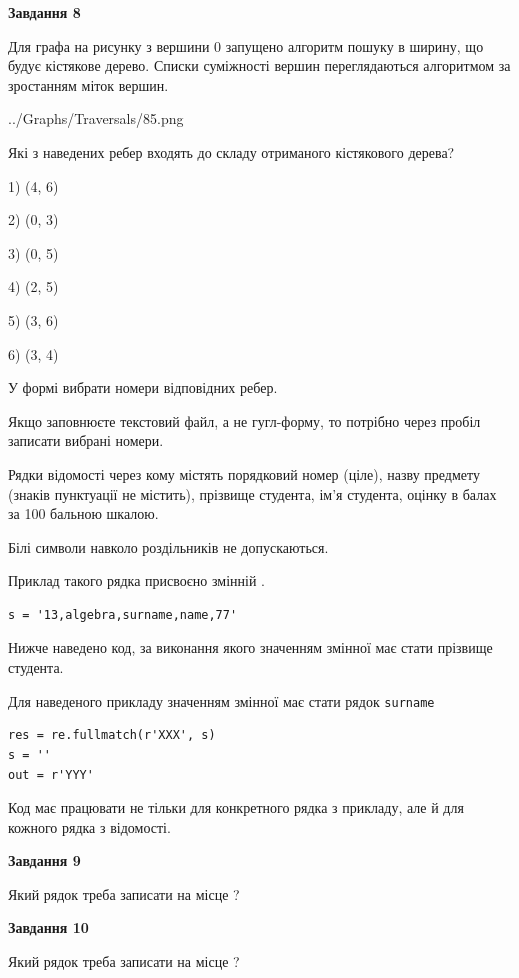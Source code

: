 \documentclass[12pt, ukrainian]{article}
\def\code#1{\Verb!#1!}
\begin{document}
{\begin {large}
{\begin {center}\textbf{Завдання 8}\end {center}}\par
Для графа на рисунку з вершини 0 запущено алгоритм пошуку в ширину, що будує кістякове дерево. Списки суміжності вершин переглядаються алгоритмом за зростанням міток вершин.\par
\begin{center}
	{../Graphs/Traversals/85.png}
\end{center}
\par Які з наведених ребер входять до складу отриманого кістякового дерева?\par
1) (4, 6)\par
2) (0, 3)\par
3) (0, 5)\par
4) (2, 5)\par
5) (3, 6)\par
6) (3, 4)\par
{\vskip 15pt} У формі вибрати номери відповідних ребер.


Якщо заповнюєте текстовий файл, а не гугл-форму, то потрібно через пробіл записа\-ти вибрані номери.\par
\newpage


Рядки відомості через кому містять порядковий номер (ціле), назву предмету (зна\-ків пунктуації не містить), прізвище студента, ім'я студента, оцінку в балах за 100 бальною шкалою.

Білі символи навколо роздільників не допускаються.

Приклад такого рядка присвоєно змінній .



\begin{verbatim}
s = '13,algebra,surname,name,77'
\end{verbatim}


Нижче наведено код, за виконання якого значенням змінної  має стати прізвище студента.

Для наведеного прикладу значенням змінної  має стати рядок \code{surname}



\begin{verbatim}
res = re.fullmatch(r'XXX', s)
s = ''
out = r'YYY'
\end{verbatim}


Код має працювати не тільки для конкретного рядка з прикладу, але й для кожного рядка з відомості.

{\begin {center}\textbf{Завдання 9}\end {center}}\par
Який рядок треба записати на місце  ?\par
\vspace{5mm}


{\begin {center}\textbf{Завдання 10}\end {center}}\par
Який рядок треба записати на місце  ?\par


\newpage


\end {large}}
\end{document}
